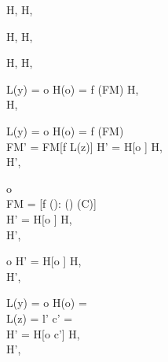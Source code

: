\begin{figure}
  {H,  \; \FRedTo \; H, }

  \RuleSpace{}

  {H,  \; \FRedTo \; H, }

  \RuleSpace{}

  {H,  \; \FRedTo \; H, }

  \RuleSpace{}

  {L(y) = o \andalso H(o) =  \andalso f \in \dom(FM)}
  {H,  \; \FRedTo  \\ 
  H, }

  \RuleSpace{}

  {L(y) = o \andalso H(o) =  \andalso f \in \dom(FM) \\
  FM' = FM[f \mapsto L(z)] \andalso H' = H[o \mapsto {}]}
  {H,  \; \FRedTo \\
   H', }

  \RuleSpace{}

  {o \\
  FM = [f \mapsto {}(\sigma): () \in \fdecls(C)] \\
  H' = H[o \mapsto {}]}
  {H,  \; \FRedTo \\
  H', }
  
  \RuleSpace{}

  {o \andalso
  H' = H[o \mapsto \Cell{\emptyset, \bot_{\LatVals{}}}]}
  {H,  \; \FRedTo \\
  H', }

  \RuleSpace{}
  
  {L(y) = o \andalso H(o) =  \\
  L(z) = l' \andalso c' =  \\
  H' = H[o \mapsto c']}
  {H,  \; \FRedTo \\
  H', }


\end{figure}
